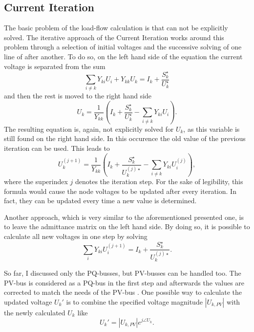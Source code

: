 \subsection{Current Iteration}
\label{sec:current_iteration}

The basic problem of the load-flow calculation is that  can not be explicitly solved. The iterative approach of the Current Iteration works around this problem through a selection of initial voltages and the successive solving of one line of  after another. To do so, on the left hand side of the equation the current voltage is separated from the sum
\begin{equation}
	\sum_{i \ne k} Y_{ki} U_i + Y_{kk} U_k = I_k + \frac{S_k^\star}{U_k^\star}
\end{equation}
and then the rest is moved to the right hand side
\begin{equation}
	 U_k = \frac{1}{Y_{kk}} \left( I_k + \frac{S_k^\star}{U_k^\star} - \sum_{i \ne k} Y_{ki} U_i \right).
\end{equation}
The resulting equation is, again, not explicitly solved for $U_k$, as this variable is still found on the right hand side. In this occurence the old value of the previous iteration can be used. This leads to
\begin{equation}
	 U_k^{(j + 1)} = \frac{1}{Y_{kk}} \left( I_k + \frac{S_k^\star}{U_k^{(j) \star}} - \sum_{i \ne k} Y_{ki} U_i^{(j)} \right),
\end{equation}
where the superindex $j$ denotes the iteration step. For the sake of legibility, this formula would cause the node voltages to be updated after every iteration. In fact, they can be updated every time a new value is determined.

Another approach, which is very similar to the aforementioned presented one, is to leave the admittance matrix on the left hand side. By doing so, it is possible to calculate all new voltages in one step by solving
\begin{equation}
	\sum_i Y_{ki} U_i^{(j + 1)} = I_k + \frac{S_k^\star}{U_k^{(j)\star}}.
\end{equation}

So far, I discussed only the PQ-busses, but PV-busses can be handled too. The PV-bus is considered as a PQ-bus in the first step and afterwards the values are corrected to match the needs of the PV-bus \citep[p. 211]{powerSystemAnalysis}. One possible way to calculate the updated voltage $U_k'$ is to combine the specified voltage magnitude $|U_{k,PV}|$ with the newly calculated $U_k$ like
\begin{equation}
	U_k' = |U_{k,PV}| e^{j \angle U_k}.
\end{equation}

